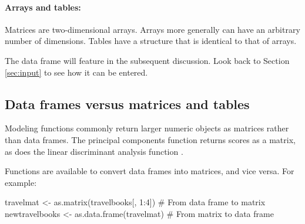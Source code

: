 \paragraph{Arrays and tables:} Matrices are two-dimensional arrays.
Arrays more generally can have an arbitrary number of dimensions.
Tables have a structure that is identical to that of arrays.

The data frame  will feature in the subsequent
discussion.  Look back to Section \ref{sec:input} to see how it can be
entered.



\subsection{Data frames versus matrices and tables}\label{ss:df-mat}

  Modeling functions commonly return
larger numeric objects as matrices rather than data frames. The
principal components function  returns scores as a
matrix, as does the linear discriminant analysis function
.

Functions are available to convert data frames into matrices, and vice
versa. For example:
\begin{Schunk}
\begin{Sinput}
travelmat <- as.matrix(travelbooks[, 1:4])
  # From data frame to matrix
newtravelbooks <- as.data.frame(travelmat)
  # From matrix to data frame
\end{Sinput}
\end{Schunk}

\enlargethispage{24pt}

